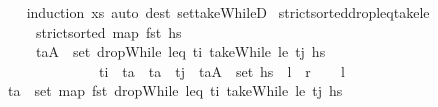 \begin{isabellebody}
\ \ %
\endisadelimproof
%
\isatagproof
{}\isamarkupfalse%
\ {\isacharparenleft}{\kern0pt}induction\ xs{\isacharparenright}{\kern0pt}\ {\isacharparenleft}{\kern0pt}auto\ dest{\isacharbang}{\kern0pt}{\isacharcolon}{\kern0pt}\ set{\isacharunderscore}{\kern0pt}takeWhileD{\isacharparenright}{\kern0pt}%
\endisatagproof
{\isafoldproof}%
%
\isadelimproof
\isanewline
%
\endisadelimproof
\isanewline
{}\isamarkupfalse%
\ strict{\isacharunderscore}{\kern0pt}sorted{\isacharunderscore}{\kern0pt}drop{\isacharunderscore}{\kern0pt}leq{\isacharunderscore}{\kern0pt}take{\isacharunderscore}{\kern0pt}le{\isacharprime}{\kern0pt}{\isacharcolon}{\kern0pt}\isanewline
\ \ \ \ \ {\isachardoublequoteopen}strict{\isacharunderscore}{\kern0pt}sorted\ {\isacharparenleft}{\kern0pt}map\ fst\ hs{\isacharparenright}{\kern0pt}{\isachardoublequoteclose}\isanewline
\ \ \ \ \ {\isachardoublequoteopen}{\isacharparenleft}{\kern0pt}t\isactrlsub a{\isacharcomma}{\kern0pt}A{\isacharparenright}{\kern0pt}\ {\isasymin}\ set\ {\isacharparenleft}{\kern0pt}dropWhile\ {\isacharparenleft}{\kern0pt}leq\ t\isactrlsub i{\isacharparenright}{\kern0pt}\ {\isacharparenleft}{\kern0pt}takeWhile\ {\isacharparenleft}{\kern0pt}le\ t\isactrlsub j{\isacharparenright}{\kern0pt}\ hs{\isacharparenright}{\kern0pt}{\isacharparenright}{\kern0pt}\ {\isasymlongleftrightarrow}\ \isanewline
\ \ \ \ \ \ \ \ \ \ \ \ \ \ {\isacharparenleft}{\kern0pt}t\isactrlsub i\ {\isacharless}{\kern0pt}\ t\isactrlsub a\ {\isasymand}\ t\isactrlsub a\ {\isacharless}{\kern0pt}\ t\isactrlsub j\ {\isasymand}\ {\isacharparenleft}{\kern0pt}t\isactrlsub a{\isacharcomma}{\kern0pt}A{\isacharparenright}{\kern0pt}\ {\isasymin}\ set\ hs{\isacharparenright}{\kern0pt}{\isachardoublequoteclose}\ {\isacharparenleft}{\kern0pt}\ {\isachardoublequoteopen}{\isacharquery}{\kern0pt}l\ {\isasymlongleftrightarrow}\ {\isacharquery}{\kern0pt}r{\isachardoublequoteclose}{\isacharparenright}{\kern0pt}\isanewline
%
\isadelimproof
%
\endisadelimproof
%
\isatagproof
{}\isamarkupfalse%
\isanewline
\ \ \isamarkupfalse%
\ {\isacharquery}{\kern0pt}l\isanewline
\ \ \isamarkupfalse%
\ {\isachardoublequoteopen}t\isactrlsub a\ {\isasymin}\ set\ {\isacharparenleft}{\kern0pt}map\ fst\ {\isacharparenleft}{\kern0pt}dropWhile\ {\isacharparenleft}{\kern0pt}leq\ t\isactrlsub i{\isacharparenright}{\kern0pt}\ {\isacharparenleft}{\kern0pt}takeWhile\ {\isacharparenleft}{\kern0pt}le\ t\isactrlsub j{\isacharparenright}{\kern0pt}\ hs{\isacharparenright}{\kern0pt}{\isacharparenright}{\kern0pt}{\isacharparenright}{\kern0pt}{\isachardoublequoteclose}\isanewline

\end{isabellebody}
